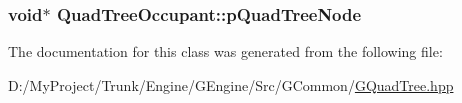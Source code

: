 \subsubsection[{p\+Quad\+Tree\+Node}]{\setlength{\rightskip}{0pt plus 5cm}void$\ast$ Quad\+Tree\+Occupant\+::p\+Quad\+Tree\+Node}\label{class_quad_tree_occupant_adb6031d6b9054c136f63b495813b622c}


The documentation for this class was generated from the following file\+:\begin{DoxyCompactItemize}
\item 
D\+:/\+My\+Project/\+Trunk/\+Engine/\+G\+Engine/\+Src/\+G\+Common/\hyperlink{_g_quad_tree_8hpp}{G\+Quad\+Tree.\+hpp}\end{DoxyCompactItemize}
